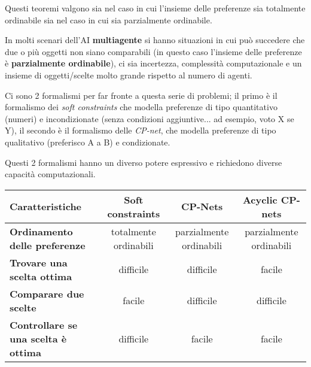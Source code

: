 Questi teoremi valgono sia nel caso in cui l'insieme delle preferenze sia
totalmente ordinabile sia nel caso in cui sia parzialmente ordinabile.

In molti scenari dell'AI \textbf{multiagente} si hanno situazioni in cui
può succedere che due o più oggetti non siano comparabili (in questo caso
l'insieme delle preferenze è \textbf{parzialmente ordinabile}), ci sia
incertezza, complessità computazionale e un insieme di oggetti/scelte molto
grande rispetto al numero di agenti.

Ci sono 2 formalismi per far fronte a questa serie di problemi; il primo
è il formalismo dei \textit{soft constraints} che modella preferenze di
tipo quantitativo (numeri) e incondizionate (senza condizioni aggiuntive... ad
esempio, voto X se Y), il secondo è il formalismo delle \textit{CP-net}, che
modella preferenze di tipo qualitativo (preferisco A a B) e condizionate.

Questi 2 formalismi hanno un diverso potere espressivo e richiedono
diverse capacità computazionali.

\begin{table}[H]
\begin{tabular}{|p{4cm}|c|c|c|}
\hline
\textbf{Caratteristiche} & \textbf{Soft constraints} & \textbf{CP-Nets} &
\textbf{Acyclic CP-nets} \\ \hline
\textbf{Ordinamento delle preferenze} & totalmente ordinabili & parzialmente
ordinabili & parzialmente ordinabili \\ \hline
\textbf{Trovare una scelta ottima} & difficile & difficile & facile \\ \hline
\textbf{Comparare due scelte} & facile & difficile & difficile \\ \hline
\textbf{Controllare se una scelta è ottima} & difficile & facile & facile \\
\hline
\end{tabular}
\end{table}

